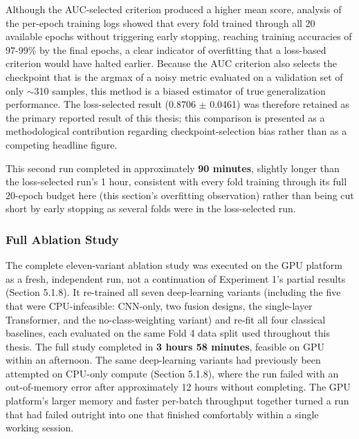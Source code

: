 \documentclass[pdflatex,sn-mathphys-num]{sn-jnl}%
\theoremstyle{thmstyleone}%
\theoremstyle{thmstyletwo}%
\theoremstyle{thmstylethree}%
\begin{document}
Although the AUC-selected criterion produced a higher mean score, analysis of the per-epoch training logs showed that every fold trained through all 20 available epochs without triggering early stopping, reaching training accuracies of 97-99\% by the final epochs, a clear indicator of overfitting that a loss-based criterion would have halted earlier. Because the AUC criterion also selects the checkpoint that is the argmax of a noisy metric evaluated on a validation set of only $\sim$310 samples, this method is a biased estimator of true generalization performance. The loss-selected result (0.8706 $\pm$ 0.0461) was therefore retained as the primary reported result of this thesis; this comparison is presented as a methodological contribution regarding checkpoint-selection bias rather than as a competing headline figure.

This second run completed in approximately \textbf{90 minutes}, slightly longer than the loss-selected run's 1 hour, consistent with every fold training through its full 20-epoch budget here (this section's overfitting observation) rather than being cut short by early stopping as several folds were in the loss-selected run.

\subsubsection{Full Ablation Study}\label{sec5_2_7}

The complete eleven-variant ablation study was executed on the GPU platform as a fresh, independent run, not a continuation of Experiment 1's partial results (Section 5.1.8). It re-trained all seven deep-learning variants (including the five that were CPU-infeasible: CNN-only, two fusion designs, the single-layer Transformer, and the no-class-weighting variant) and re-fit all four classical baselines, each evaluated on the same Fold 4 data split used throughout this thesis. The full study completed in \textbf{3 hours 58 minutes}, feasible on GPU within an afternoon. The same deep-learning variants had previously been attempted on CPU-only compute (Section 5.1.8), where the run failed with an out-of-memory error after approximately 12 hours without completing. The GPU platform's larger memory and faster per-batch throughput together turned a run that had failed outright into one that finished comfortably within a single working session.
\end{document}
